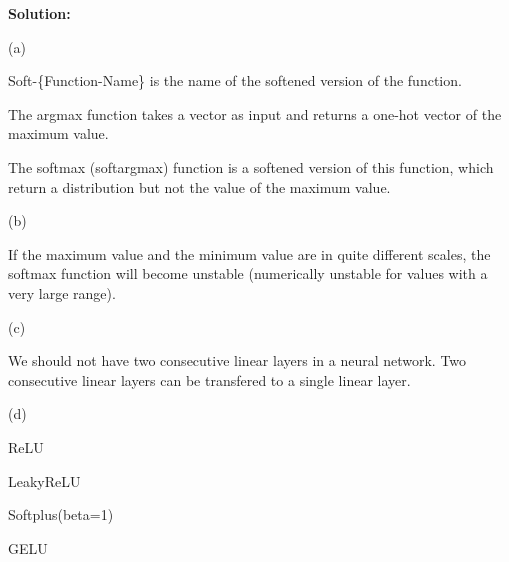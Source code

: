 \textbf{Solution:}

(a)

Soft-\{Function-Name\} is the name of the softened version of the function.

The argmax function takes a vector as input and returns a one-hot vector of the maximum value.

The softmax (softargmax) function is a softened version of this function, which return a distribution but not the value of the maximum value.


(b)

If the maximum value and the minimum value are in quite different scales, the softmax function will become unstable (numerically unstable for values with a very large range). 

(c)

We should not have two consecutive linear layers in a neural network. Two consecutive linear layers can be transfered to a single linear layer.


(d)


ReLU 

LeakyReLU


Softplus(beta=1)

GELU



